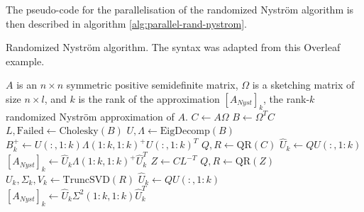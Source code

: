 \documentclass[a4paper, 12pt,oneside]{article}
\begin{document}
	The pseudo-code for the parallelisation of the randomized Nystr\"om algorithm is then described in algorithm \ref{alg:parallel-rand-nystrom}.
	\begin{algorithm}[htb]
		\caption{Randomized Nystr\"om algorithm. The syntax was adapted from this Overleaf example.}\label{alg:parallel-rand-nystrom}
		\begin{algorithmic}
		\Require $A$ is an $n\times n$ symmetric positive semidefinite matrix, $\Omega$ is a sketching matrix of size $n\times l$, and $k$ is the rank of the approximation
		\Ensure $[A_{N y s t}]_k$, the rank-$k$ randomized Nystr\"om approximation of $A$. 
		\State $C \gets A \Omega$
		\State $B \gets \Omega^T C$
		\State $L, \text{Failed} \gets \text{Cholesky}(B)$ 
			\State $U, \Lambda \gets \text{EigDecomp}(B)$ 
			\State $B_k^{+} \gets U(:,1:k) \Lambda(1: k, 1: k)^{+} U(:, 1: k)^T$
			\State $Q, R \gets \text{QR}(C)$ 
			\State $\hat{U}_k \gets Q U(:, 1:k)$ 
			\State $[A_{N y s t}]_k \gets \hat{U}_k \Lambda(1: k, 1: k)^{+} \hat{U}_k^T$ 
		\Else{}
			\State $Z \gets C L^{-T}$ 
			\State $Q, R \gets \text{QR}(Z)$ 
			\State $U_k, \Sigma_k, V_k \gets \text{TruncSVD}(R)$
			\State $\hat{U}_k \gets Q U(:, 1:k)$ 
			\State $[A_{N y s t}]_k \gets \hat{U}_k \Sigma^2(1: k, 1: k) \hat{U}_k^T$ 
		\EndIf
		\end{algorithmic}
	\end{algorithm}
\end{document}
